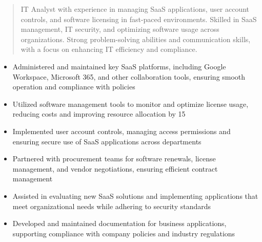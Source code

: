 



\makecvheader

\begin{quote}
  \noindent
  IT Analyst with experience in managing SaaS applications, user account controls, and software licensing in fast-paced environments. Skilled in SaaS management, IT security, and optimizing software usage across organizations. Strong problem-solving abilities and communication skills, with a focus on enhancing IT efficiency and compliance.
\end{quote}

\par\smallskip
\noindent
\begin{minipage}{20cm}
  \begin{minipage}{9.75cm}
    \begin{itemize}
      \item Administered and maintained key SaaS platforms, including Google Workspace, Microsoft 365, and other collaboration tools, ensuring smooth operation and compliance with policies
      \item Utilized software management tools to monitor and optimize license usage, reducing costs and improving resource allocation by 15%
      \item Implemented user account controls, managing access permissions and ensuring secure use of SaaS applications across departments
    \end{itemize}
  \end{minipage}
  \hfill
  \begin{minipage}{9.75cm}
    \begin{itemize}
      \item Partnered with procurement teams for software renewals, license management, and vendor negotiations, ensuring efficient contract management
      \item Assisted in evaluating new SaaS solutions and implementing applications that meet organizational needs while adhering to security standards
      \item Developed and maintained documentation for business applications, supporting compliance with company policies and industry regulations
    \end{itemize}
  \end{minipage}
\end{minipage}
\par\smallskip
\divider

